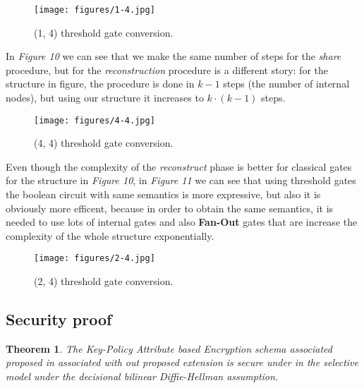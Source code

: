 \documentclass[12pt]{article}
\newtheorem{theorem}{Theorem}
\begin{document}
\begin{center}
  \begin{figure}[htpb]
\centering
\texttt{[image: figures/1-4.jpg]}
\caption{
    (1, 4) threshold gate conversion.
}
\end{figure}
\end{center}

In \textit{Figure 10} we can see that we make the same number of steps for the \textit{share} procedure, but for the \textit{reconstruction} procedure is a different story: for the structure in figure, the procedure is done in $k - 1$ steps (the number of internal nodes), but using our structure it increases to $k \cdot (k - 1)$ steps.

\begin{center}
  \begin{figure}[htpb]
\centering
\texttt{[image: figures/4-4.jpg]}
\caption{
    (4, 4) threshold gate conversion.
}
\end{figure}
\end{center}

Even though the complexity of the \textit{reconstruct} phase is better for classical gates for the structure in \textit{Figure 10}, in \textit{Figure 11} we can see that using threshold gates the boolean circuit with same semantics is more expressive, but also it is obviously more efficent, because in order to obtain the same semantics, it is needed to use lots of internal gates and also \textbf{Fan-Out} gates that are increase the complexity of the whole structure exponentially.

\begin{center}
  \begin{figure}[htpb]
\centering
\texttt{[image: figures/2-4.jpg]}
\caption{
    (2, 4) threshold gate conversion.
}
\end{figure}
\end{center}


\subsection{Security proof}

\begin{theorem}
The \textit{Key-Policy Attribute based Encryption} schema associated proposed in \cite{fltccd} associated with out proposed extension is secure under in the selective model under the decisional bilinear Diffie-Hellman assumption.
\end{theorem}
\end{document}
